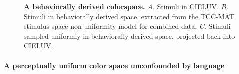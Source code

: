{\begin{figure}
    \centering
    \begin{subfigure}[t]{0.3\textwidth}
         \centering
         \caption{}
         
         \label{fig:CIELUV}
    \end{subfigure}
    \hfill
    \begin{subfigure}[t]{0.3\textwidth}
         \centering
         \caption{}
         
         \label{fig:MACBEHspace}
    \end{subfigure}
    \hfill
    \begin{subfigure}[t]{0.3\textwidth}
         \centering
         \caption{}
         
         \label{fig:UniformStimsInCIELUV}
    \end{subfigure}
           \caption{\textbf{A behaviorally derived colorspace.} 
           \emph{A.} Stimuli in CIELUV. 
           \emph{B.} Stimuli in behaviorally derived space, extracted from the TCC-MAT stimulus-space non-uniformity model for combined data. 
           \emph{C.} Stimuli sampled uniformly in behaviorally derived space, projected back into CIELUV.}
        \label{fig:MACBEHcolorspace}
    
\end{figure}


\paragraph{A perceptually uniform color space unconfounded by language}

}
